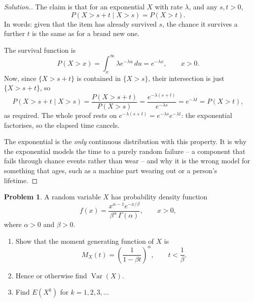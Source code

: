 \documentclass[12pt,a4paper]{report}
\theoremstyle{definition}
\theoremstyle{plain}
\theoremstyle{definition}
\newtheorem{problemx}{Problem}[section]
\newenvironment{problem}{\begin{problemx}}{\end{problemx}}
\newenvironment{solution}
  {\renewcommand{\qedsymbol}{}\begin{proof}[\textit{Solution}.]}
  {\end{proof}}
\begin{document}
\begin{solution}
The claim is that for an exponential $X$ with rate $\lambda$, and any $s,t>0$,
\[P(X>s+t \mid X>s) = P(X>t).\]
In words: given that the item has already survived $s$, the chance it survives a further
$t$ is the same as for a brand new one.

The survival function is
\[P(X>x) = \int_x^{\infty}\lambda e^{-\lambda u}\,du = e^{-\lambda x}, \qquad x>0.\]
Now, since $\{X>s+t\}$ is contained in $\{X>s\}$, their intersection is just
$\{X>s+t\}$, so
\[P(X>s+t \mid X>s) = \frac{P(X>s+t)}{P(X>s)}
 = \frac{e^{-\lambda(s+t)}}{e^{-\lambda s}} = e^{-\lambda t} = P(X>t),\]
as required. The whole proof rests on $e^{-\lambda(s+t)} = e^{-\lambda s}e^{-\lambda t}$:
the exponential factorises, so the elapsed time cancels.

The exponential is the \emph{only} continuous distribution with this property. It is why
the exponential models the time to a purely random failure -- a component that fails
through chance events rather than wear -- and why it is the wrong model for something
that ages, such as a machine part wearing out or a person's lifetime.
\end{solution}

\begin{problem}
A random variable $X$ has probability density function
\[f(x) = \frac{x^{\alpha-1}e^{-x/\beta}}{\beta^{\alpha}\,\Gamma(\alpha)},\qquad x>0,\]
where $\alpha>0$ and $\beta>0$.
\begin{enumerate}
\item[(a).] Show that the moment generating function of $X$ is
\[M_X(t) = \left(\frac{1}{1-\beta t}\right)^{\alpha},\qquad t<\frac{1}{\beta}.\]
\item[(b).] Hence or otherwise find $\operatorname{Var}(X)$.
\item[(c).] Find $E(X^k)$ for $k = 1, 2, 3, \dots$
\end{enumerate}
\end{problem}
\end{document}
